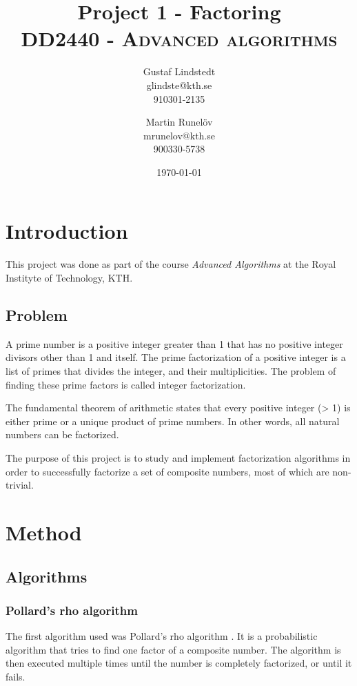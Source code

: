 \documentclass[paper=a4, fontsize=11pt,numbers=endperiod]{scrartcl} %
\title{	
\huge Project 1 - Factoring \\ %
\vspace{10pt}
\normalfont \normalsize 
\textsc{DD2440 - Advanced algorithms } \\ [25pt] %
}
\author{Gustaf Lindstedt \\ glindste@kth.se \\ 910301-2135 \and Martin Runelöv \\ mrunelov@kth.se \\ 900330-5738}
\date{\vspace{8pt}\normalsize\today} %
\numberwithin{equation}{section} %
\numberwithin{figure}{section} %
\numberwithin{table}{section} %
\begin{document}
\maketitle %




\section{Introduction}

This project was done as part of the course \emph{Advanced Algorithms} at the Royal Instityte of Technology, KTH.

\subsection{Problem}
A prime number is a positive integer greater than 1 that has no positive integer divisors other than 1 and itself.
The prime factorization of a positive integer is a list of primes that divides the integer, and their multiplicities.
The problem of finding these prime factors is called integer factorization.

The fundamental theorem of arithmetic states that every positive integer (> 1) is either prime or a unique product of prime numbers.
In other words, all natural numbers can be factorized.

The purpose of this project is to study and implement factorization algorithms in order to successfully factorize a set of composite numbers, most of which are non-trivial.



\section{Method}
\subsection{Algorithms}
\subsubsection{Pollard's rho algorithm}
The first algorithm used was Pollard's rho algorithm \cite{pollard}\cite{algnotes}.
It is a probabilistic algorithm that tries to find one factor of a composite number.
The algorithm is then executed multiple times until the number is completely factorized, or until it fails.
\end{document}
